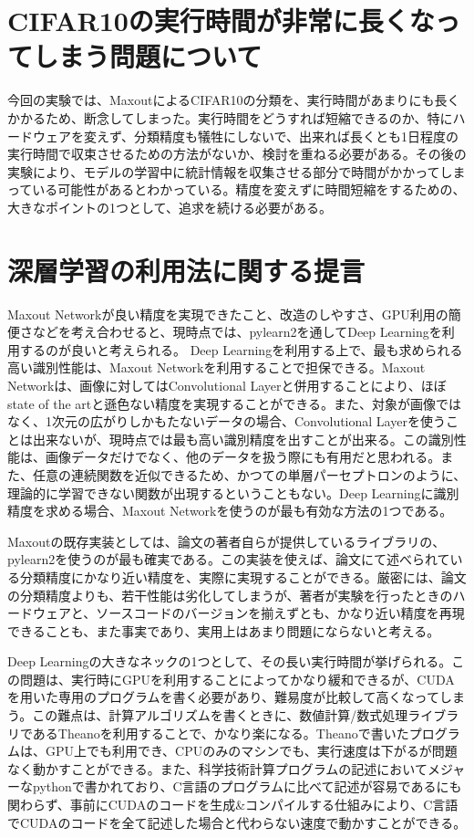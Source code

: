 \section{CIFAR10の実行時間が非常に長くなってしまう問題について}
今回の実験では、MaxoutによるCIFAR10の分類を、実行時間があまりにも長くかかるため、断念してしまった。実行時間をどうすれば短縮できるのか、特にハードウェアを変えず、分類精度も犠牲にしないで、出来れば長くとも1日程度の実行時間で収束させるための方法がないか、検討を重ねる必要がある。その後の実験により、モデルの学習中に統計情報を収集させる部分で時間がかかってしまっている可能性があるとわかっている。精度を変えずに時間短縮をするための、大きなポイントの1つとして、追求を続ける必要がある。


\section{深層学習の利用法に関する提言}
Maxout Networkが良い精度を実現できたこと、改造のしやすさ、GPU利用の簡便さなどを考え合わせると、現時点では、pylearn2を通してDeep Learningを利用するのが良いと考えられる。
Deep Learningを利用する上で、最も求められる高い識別性能は、Maxout Networkを利用することで担保できる。Maxout Networkは、画像に対してはConvolutional Layerと併用することにより、ほぼstate of the artと遜色ない精度を実現することができる。また、対象が画像ではなく、1次元の広がりしかもたないデータの場合、Convolutional Layerを使うことは出来ないが、現時点では最も高い識別精度を出すことが出来る。この識別性能は、画像データだけでなく、他のデータを扱う際にも有用だと思われる。また、任意の連続関数を近似できるため、かつての単層パーセプトロンのように、理論的に学習できない関数が出現するということもない。Deep Learningに識別精度を求める場合、Maxout Networkを使うのが最も有効な方法の1つである。\par
Maxoutの既存実装としては、論文の著者自らが提供しているライブラリの、pylearn2を使うのが最も確実である。この実装を使えば、論文にて述べられている分類精度にかなり近い精度を、実際に実現することができる。厳密には、論文の分類精度よりも、若干性能は劣化してしまうが、著者が実験を行ったときのハードウェアと、ソースコードのバージョンを揃えずとも、かなり近い精度を再現できることも、また事実であり、実用上はあまり問題にならないと考える。\par
Deep Learningの大きなネックの1つとして、その長い実行時間が挙げられる。この問題は、実行時にGPUを利用することによってかなり緩和できるが、CUDAを用いた専用のプログラムを書く必要があり、難易度が比較して高くなってしまう。この難点は、計算アルゴリズムを書くときに、数値計算/数式処理ライブラリであるTheanoを利用することで、かなり楽になる。Theanoで書いたプログラムは、GPU上でも利用でき、CPUのみのマシンでも、実行速度は下がるが問題なく動かすことができる。また、科学技術計算プログラムの記述においてメジャーなpythonで書かれており、C言語のプログラムに比べて記述が容易であるにも関わらず、事前にCUDAのコードを生成\&コンパイルする仕組みにより、C言語でCUDAのコードを全て記述した場合と代わらない速度で動かすことができる。\par
